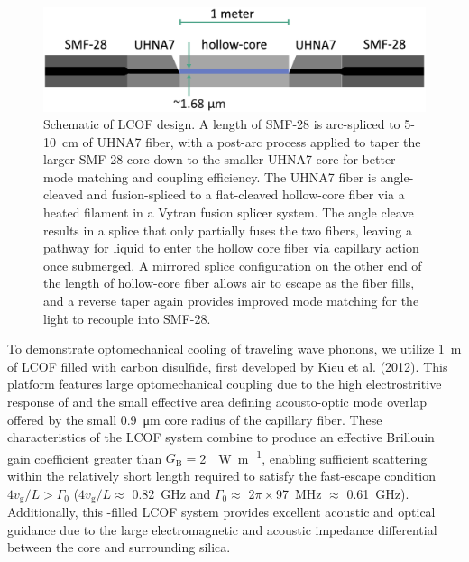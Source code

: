 \begin{figure}[t]
  \centering
  \includegraphics[width=\textwidth]{figs/2-Cooling/LCOFdiagram.png}
  \caption{Schematic of \ac{LCOF} design. A length of \ac{SMF-28} is arc-spliced to 5-\SI{10}{\centi\meter} of \ac{UHNA7} fiber, with a post-arc process applied to taper the larger \ac{SMF-28} core down to the smaller \ac{UHNA7} core for better mode matching and coupling efficiency. The \ac{UHNA7} fiber is angle-cleaved and fusion-spliced to a flat-cleaved hollow-core fiber via a heated filament in a Vytran fusion splicer system. The angle cleave results in a splice that only partially fuses the two fibers, leaving a pathway for liquid to enter the hollow core fiber via capillary action once submerged. A mirrored splice configuration on the other end of the length of hollow-core fiber allows air to escape as the fiber fills, and a reverse taper again provides improved mode matching for the light to recouple into \ac{SMF-28}.}
  \label{fig:LCOF diagram}
\end{figure}

To demonstrate optomechanical cooling of traveling wave phonons, we utilize \SI{1}{\meter} of \acl{LCOF} filled with carbon disulfide, first developed by Kieu et al. (2012). \cite{kieu2012integrated} This platform features large optomechanical coupling due to the high electrostritive response of  \cite{boyd2020nonlinear} and the small effective area defining acousto-optic mode overlap offered by the small \SI{0.9}{\micro\meter} core radius of the capillary fiber. These characteristics of the \ac{LCOF} system combine to produce an effective Brillouin gain coefficient greater than \(G_{\mathrm{B}} =\)\SI{2}{\per\watt\per\meter}, enabling sufficient scattering within the relatively short length required to satisfy the fast-escape condition \(4v_{\mathrm{g}}/L > \Gamma_{\mathrm{0}}\) (\(4v_{\mathrm{g}}/L \approx\) \SI{0.82}{\giga\hertz} and \(\Gamma_{\mathrm{0}} \approx\) 2\(\pi\times\)\SI{97}{\mega\hertz} \(\approx\) \SI{0.61}{\giga\hertz}). \cite{johnson2023laser} Additionally, this -filled \ac{LCOF} system provides excellent acoustic and optical guidance due to the large electromagnetic and acoustic impedance differential between the  core and surrounding silica. \cite{behunin2019spontaneous}

